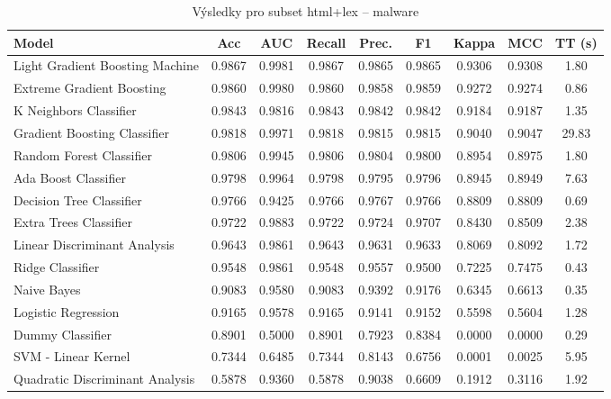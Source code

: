 \begin{table}[H]
  \centering
  \small
  \caption{Výsledky pro subset html+lex – malware}
  \begin{tabular}{|l|c|c|c|c|c|c|c|c|}
    \hline
    \textbf{Model} & \textbf{Acc} & \textbf{AUC} & \textbf{Recall} & \textbf{Prec.} & \textbf{F1} & \textbf{Kappa} & \textbf{MCC} & \textbf{TT (s)} \\
    \hline
    Light Gradient Boosting Machine & 0.9867 & 0.9981 & 0.9867 & 0.9865 & 0.9865 & 0.9306 & 0.9308 & 1.80 \\
    Extreme Gradient Boosting & 0.9860 & 0.9980 & 0.9860 & 0.9858 & 0.9859 & 0.9272 & 0.9274 & 0.86 \\
    K Neighbors Classifier & 0.9843 & 0.9816 & 0.9843 & 0.9842 & 0.9842 & 0.9184 & 0.9187 & 1.35 \\
    Gradient Boosting Classifier & 0.9818 & 0.9971 & 0.9818 & 0.9815 & 0.9815 & 0.9040 & 0.9047 & 29.83 \\
    Random Forest Classifier & 0.9806 & 0.9945 & 0.9806 & 0.9804 & 0.9800 & 0.8954 & 0.8975 & 1.80 \\
    Ada Boost Classifier & 0.9798 & 0.9964 & 0.9798 & 0.9795 & 0.9796 & 0.8945 & 0.8949 & 7.63 \\
    Decision Tree Classifier & 0.9766 & 0.9425 & 0.9766 & 0.9767 & 0.9766 & 0.8809 & 0.8809 & 0.69 \\
    Extra Trees Classifier & 0.9722 & 0.9883 & 0.9722 & 0.9724 & 0.9707 & 0.8430 & 0.8509 & 2.38 \\
    Linear Discriminant Analysis & 0.9643 & 0.9861 & 0.9643 & 0.9631 & 0.9633 & 0.8069 & 0.8092 & 1.72 \\
    Ridge Classifier & 0.9548 & 0.9861 & 0.9548 & 0.9557 & 0.9500 & 0.7225 & 0.7475 & 0.43 \\
    Naive Bayes & 0.9083 & 0.9580 & 0.9083 & 0.9392 & 0.9176 & 0.6345 & 0.6613 & 0.35 \\
    Logistic Regression & 0.9165 & 0.9578 & 0.9165 & 0.9141 & 0.9152 & 0.5598 & 0.5604 & 1.28 \\
    Dummy Classifier & 0.8901 & 0.5000 & 0.8901 & 0.7923 & 0.8384 & 0.0000 & 0.0000 & 0.29 \\
    SVM - Linear Kernel & 0.7344 & 0.6485 & 0.7344 & 0.8143 & 0.6756 & 0.0001 & 0.0025 & 5.95 \\
    Quadratic Discriminant Analysis & 0.5878 & 0.9360 & 0.5878 & 0.9038 & 0.6609 & 0.1912 & 0.3116 & 1.92 \\
    \hline
  \end{tabular}
\end{table}
\vspace{0.5cm}

